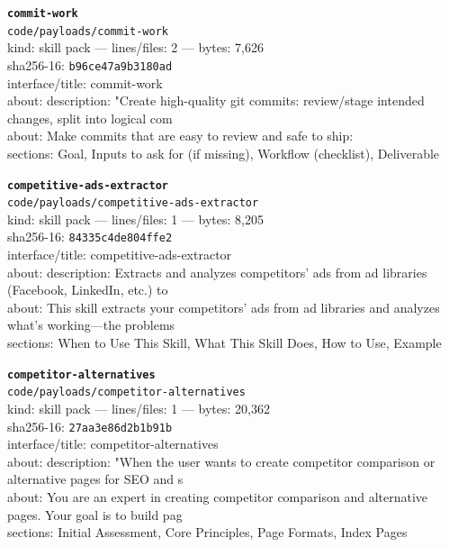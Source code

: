 \noindent\textbf{\texttt{commit-work}}\\
\texttt{code/payloads/commit-work}\\
kind: skill pack --- lines/files: 2 --- bytes: 7,626\\
sha256-16: \texttt{b96ce47a9b3180ad}\\
interface/title: commit-work\\
about: description: "Create high-quality git commits: review/stage intended changes, split into logical com\\
about: Make commits that are easy to review and safe to ship:\\
sections: Goal, Inputs to ask for (if missing), Workflow (checklist), Deliverable\\
\vspace*{6.0pt}

\noindent\textbf{\texttt{competitive-ads-extractor}}\\
\texttt{code/payloads/competitive-ads-extractor}\\
kind: skill pack --- lines/files: 1 --- bytes: 8,205\\
sha256-16: \texttt{84335c4de804ffe2}\\
interface/title: competitive-ads-extractor\\
about: description: Extracts and analyzes competitors' ads from ad libraries (Facebook, LinkedIn, etc.) to \\
about: This skill extracts your competitors' ads from ad libraries and analyzes what's working—the problems\\
sections: When to Use This Skill, What This Skill Does, How to Use, Example\\
\vspace*{6.0pt}

\noindent\textbf{\texttt{competitor-alternatives}}\\
\texttt{code/payloads/competitor-alternatives}\\
kind: skill pack --- lines/files: 1 --- bytes: 20,362\\
sha256-16: \texttt{27aa3e86d2b1b91b}\\
interface/title: competitor-alternatives\\
about: description: "When the user wants to create competitor comparison or alternative pages for SEO and s\\
about: You are an expert in creating competitor comparison and alternative pages. Your goal is to build pag\\
sections: Initial Assessment, Core Principles, Page Formats, Index Pages\\
\vspace*{6.0pt}

